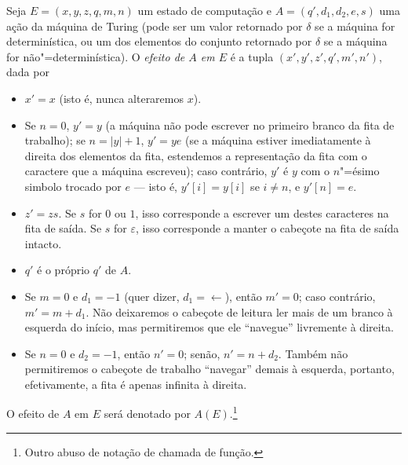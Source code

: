 Seja $E = (x, y, z, q, m, n)$ um estado de computação
e $A = (q', d_1, d_2, e, s)$ uma ação da máquina de Turing
(pode ser um valor retornado por $\delta$ se a máquina for determinística,
ou um dos elementos do conjunto retornado por $\delta$
se a máquina for não"=determinística).
O \emph{efeito de $A$ em $E$}
é a tupla $(x', y', z', q', m', n')$,
dada por
\begin{itemize}
    \setlength{\labelsep}{1ex}
    \item $x' = x$ (isto é, nunca alteraremos $x$).
    \item Se $n = 0$, $y' = y$
        (a máquina não pode escrever no primeiro branco da fita de trabalho);
        se $n = |y| + 1$, $y' = ye$
        (se a máquina estiver imediatamente à direita dos elementos da fita,
        estendemos a representação da fita com o caractere que a máquina escreveu);
        caso contrário,
        $y'$ é $y$ com o $n$"=ésimo simbolo trocado por $e$
        --- isto é, $y'[i] = y[i]$ se $i \neq n$, e $y'[n] = e$.
    \item $z' = zs$.
        Se $s$ for $0$ ou $1$,
        isso corresponde a escrever um destes caracteres na fita de saída.
        Se $s$ for $\varepsilon$,
        isso corresponde a manter o cabeçote na fita de saída intacto.
    \item $q'$ é o próprio $q'$ de $A$.
    \item Se $m = 0$ e $d_1 = -1$ (quer dizer, $d_1 = \leftarrow$),
        então $m' = 0$; caso contrário, $m' = m + d_1$.
        Não deixaremos o cabeçote de leitura ler mais de um branco
        à esquerda do início,
        mas permitiremos que ele ``navegue'' livremente à direita.
    \item Se $n = 0$ e $d_2 = -1$, então $n' = 0$; senão, $n' = n + d_2$.
        Também não permitiremos o cabeçote de trabalho ``navegar'' demais à esquerda,
        portanto, efetivamente,
        a fita é apenas infinita à direita.
\end{itemize}
\begin{notation}
    O efeito de $A$ em $E$ será denotado por $A(E)$.\footnote{
        Outro abuso de notação de chamada de função.
    }
\end{notation}
